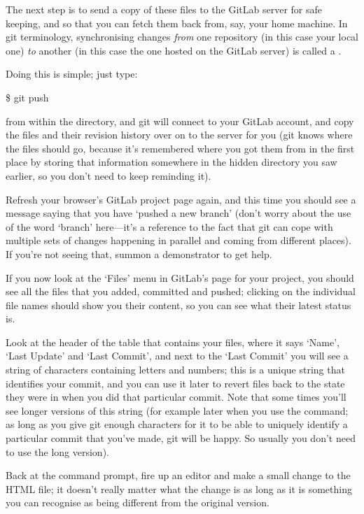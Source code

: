 The next step is to send a copy of these files to the GitLab server for safe keeping, and so that you can fetch them back from, say, your home machine. In git terminology, synchronising changes \emph{from} one repository (in this case your local one) \emph{to} another (in this case the one hosted on the GitLab server) is called a . 

Doing this is simple; just type:

\begin{ttoutenv}
\$ git push
\end{ttoutenv}

from within the  directory, and git will connect to your GitLab account, and copy the files and their revision history over on to the server for you (git knows where the files should go, because it's remembered where you got them from in the first place by storing that information somewhere in the hidden  directory you saw earlier, so you don't need to keep reminding it). 

Refresh your browser's GitLab project page again, and this time you should see a message saying that you have `pushed a new branch' (don't worry about the use of the word `branch' here---it's a reference to the fact that git can cope with multiple sets of changes happening in parallel and coming from different places). If you're not seeing that, summon a demonstrator to get help. 

If you now look at the `Files' menu in GitLab's page for your  project, you should see all the files that you added, committed and pushed; clicking on the individual file names should show you their content, so you can see what their latest status is. 

Look at the header of the table that contains your files, where it says `Name', `Last Update' and `Last Commit', and next to the `Last Commit' you will see a string of characters containing letters and numbers; this is a unique string that identifies your commit, and you can use it later to revert files back to the state they were in when you did that particular commit. Note that some times you'll see longer versions of this string (for example later when you use the  command; as long as you give git enough characters for it to be able to uniquely identify a particular commit that you've made, git will be happy. So usually you don't need to use the long version).

Back at the command prompt, fire up an editor and make a small change to the HTML file; it doesn't really matter what the change is as long as it is something you can recognise as being different from the original version.

